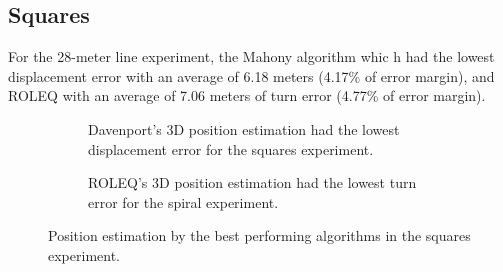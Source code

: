\newpage

\subsection{Squares}

For the 28-meter line experiment, the Mahony algorithm whic h had the lowest displacement error with an average of 6.18 meters (4.17\% of error margin), and ROLEQ with an average of 7.06 meters of turn error (4.77\% of error margin).

\vspace{-0.5cm}

\vspace{-1.5cm}

\begin{figure}[H]
    \centering
    \begin{subfigure}{0.49\textwidth}
        \centering
        \resizebox{1\linewidth}{!}{}
        \caption{Davenport's 3D position estimation had the lowest displacement error for the squares experiment.}
        \label{fig:squares2D}
    \end{subfigure}
    \begin{subfigure}{0.49\textwidth}
        \centering
        \resizebox{1\linewidth}{!}{}
        \caption{ROLEQ's 3D position estimation had the lowest turn error for the spiral experiment.}
        \label{fig:squares3D}
    \end{subfigure}
    \caption{Position estimation by the best performing algorithms in the squares experiment.}
    \label{fig:squares}
\end{figure}
